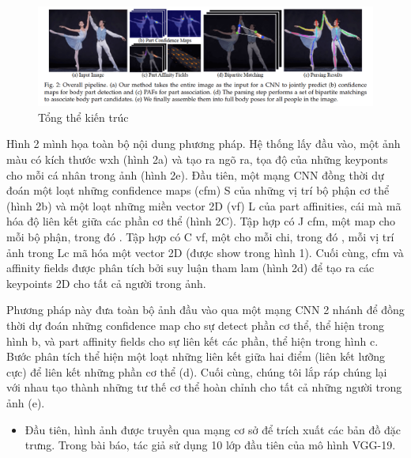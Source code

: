 
\FloatBarrier
\begin{figure}[htp]
\begin{center}
\includegraphics[scale=0.3]{chap3/c3_figs/pipeline.png}
\end{center}
\caption{Tổng thể kiến trúc}
\label{fig:pipelineS}
\end{figure}
\FloatBarrier

Hình 2 mình họa toàn bộ nội dung phương pháp. Hệ thống lấy đầu vào, một ảnh màu có kích thước wxh (hình 2a) và tạo ra ngõ ra, tọa độ của những keyponts cho mỗi cá nhân trong ảnh (hình 2e). Đầu tiên, một mạng CNN đồng thời dự đoán một loạt những confidence maps (cfm) S của những vị trí bộ phận cơ thể (hình 2b) và một loạt những miền vector 2D (vf) L của part affinities, cái mà mã hóa độ liên kết giữa các phần cơ thể (hình 2C). Tập hợp  có J cfm, một map cho mỗi bộ phận, trong đó . Tập hợp  có C vf, một cho mỗi chi, trong đó , mỗi vị trí ảnh trong Lc mã hóa một vector 2D (được show trong hình 1). Cuối cùng, cfm và affinity fields được phân tích bởi suy luận tham lam (hình 2d) để tạo ra các keypoints 2D cho tất cả người trong ảnh.

Phương pháp này đưa toàn bộ ảnh đầu vào qua một mạng CNN 2 nhánh để đồng thời dự đoán những confidence map cho sự detect phần cơ thể, thể hiện trong hình b, và part affinity fields cho sự liên kết các phần, thể hiện trong hình c. Bước phân tích thể hiện một loạt những liên kết giữa hai điểm (liên kết lưỡng cực) để liên kết những phần cơ thể (d). Cuối cùng, chúng tôi lắp ráp chúng lại với nhau tạo thành những tư thế cơ thể hoàn chỉnh cho tất cả những người trong ảnh (e).

\begin{itemize} %
\item Đầu tiên, hình ảnh được truyền qua mạng cơ sở để trích xuất các bản đồ đặc trưng. Trong bài báo, tác giả sử dụng 10 lớp đầu tiên của mô hình VGG-19.
\end{itemize}


